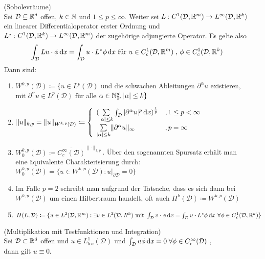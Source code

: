 \begin{Definition}(Sobolevräume)\\
	Sei $\mathcal{D} \subseteq \mathbb{R}^d $ offen, $ k \in \mathbb{N} $ und $ 1 \leq p \leq \infty $.  Weiter sei $ L : C^1(\mathcal{D},\mathbb{R}^m) \to L^{\infty}(\mathcal{D},\mathbb{R}^k) $ ein linearer Differentialoperator erster Ordnung und $ L^{\star} : C^1(\mathcal{D},\mathbb{R}^k) \to L^{\infty}(\mathcal{D},\mathbb{R}^m) $ der zugehörige adjungierte Operator. Es gelte also
	\[
	\int_{\mathcal{D}} Lu \cdot \phi \, \mathrm{d} x = \int_{\mathcal{D}} u \cdot L^{\star} \phi \, \mathrm{d} x \text{ für } u \in C^1_c(\mathcal{D},\mathbb{R}^m) \text{ , } \phi \in C^1_c (\mathcal{D},\mathbb{R}^k)
	\]
	Dann sind:
	\begin{enumerate}[label=(\alph*)]
		\item $ W^{k,p} (\mathcal{D}) \coloneqq \{ u \in L^p(\mathcal{D})$ und die schwachen Ableitungen $ \partial^{\alpha}u $ existieren, mit $ \partial^{\alpha}u \in L^p(\mathcal{D}) $ für alle $ \alpha \in \mathbb{N}_0^d , |\alpha| \leq k \} $	
		\item $ \lVert u \rVert_{k,p} =  \lVert u \rVert_{W^{k,p}(\mathcal{D})} \coloneqq 
				\begin{cases}
					\begin{array}{lll}
						(\sum\limits_{|\alpha|\leq k} \int_{\mathcal{D}} |\partial^{\alpha} u |^p \, \mathrm{d} x)^{\frac{1}{p}} &, 1 \leq p < \infty \\
						\sum\limits_{|\alpha|\leq k}   \lVert \partial^{\alpha} u \rVert_{\infty}        &, p = \infty
					\end{array}
				\end{cases}  $
		\item $ W_0^{k,p}(\mathcal{D}) \coloneqq \overline{ C_c^{\infty}(\mathcal{D}) }^{\lVert \cdot \rVert_{k,p}} $. Über den sogenannten Spursatz erhält man eine äquivalente Charakterisierung durch: 
		$ W_0^{k,p}(\mathcal{D}) = \{ u \in W^{k,p}(\mathcal{D}) : u|_{\partial \mathcal{D}} = 0 \}$
		\item Im Falle $ p = 2 $ schreibt man aufgrund der Tatsache, dass es sich dann bei $ W^{k,p}(\mathcal{D}) $ um einen Hilbertraum handelt, oft auch $ H^k(\mathcal{D}) \coloneqq W^{k,p}(\mathcal{D}) $
		\item $ H(L,\mathcal{D}) \coloneqq \{ u \in L^2(\mathcal{D},\mathbb{R}^m) : \exists v \in L^2(\mathcal{D},R^k) \text{ mit } \int_{\mathcal{D}} v \cdot \phi \, \mathrm{d} x = \int_{\mathcal{D}} u \cdot L^{\star}\phi \, \mathrm{d} x \ \forall \phi \in C^1_c(\mathcal{D},\mathbb{R}^k) \}$
	\end{enumerate}
\end{Definition}

\begin{Satz}(Multiplikation mit Testfunktionen und Integration) \\ 
	\label{testfunktionen}
	Sei $\mathcal{D} \subset \mathbb{R}^d$ offen und $u \in L_{\text{loc}}^1(\mathcal{D})$ und $\int_{\mathcal{D}} u \phi \, \mathrm{d} x = 0 \; \forall \phi \in C_c^{\infty}(\mathcal{D})$ ,\\
	dann gilt $ u \equiv 0 $.
\end{Satz}

